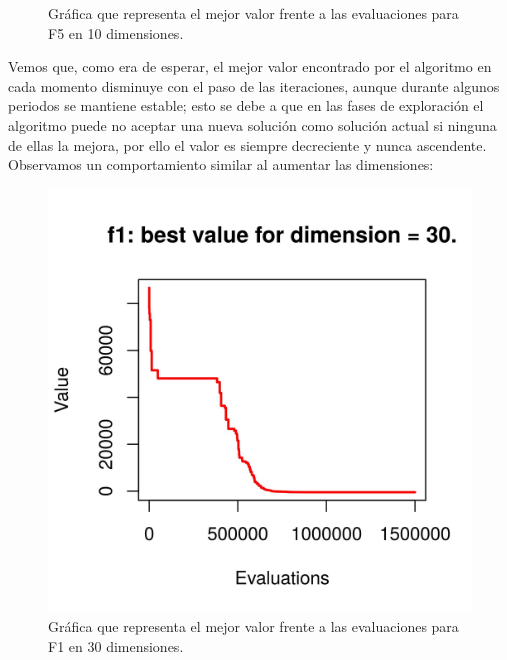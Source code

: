 \documentclass[11pt,a4paper]{article}
\begin{document}
\begin{figure}[!h]
\begin{minipage}[b]{0.4\textwidth}
			\caption{Gráfica que representa el mejor valor frente a las evaluaciones para F5 en 10 dimensiones.}
		\end{minipage}
	\end{figure}
	
	\noindent Vemos que, como era de esperar, el mejor valor encontrado por el algoritmo en cada momento disminuye con el paso de las iteraciones, aunque durante algunos periodos se mantiene estable; esto se debe a que en las fases de exploración el algoritmo puede no aceptar una nueva solución como solución actual si ninguna de ellas la mejora, por ello el valor es siempre decreciente y nunca ascendente. Observamos un comportamiento similar al aumentar las dimensiones:
	
	\begin{figure}[!h]
		\centering
		\begin{minipage}[b]{0.4\textwidth}
			\includegraphics[width=\textwidth]{Imagenes/VS_f1_d30.jpg}
			\caption{Gráfica que representa el mejor valor frente a las evaluaciones para F1 en 30 dimensiones.}
		\end{minipage}
		\hfill
		\begin{minipage}[b]{0.4\textwidth}

\end{minipage}
\end{figure}
\end{document}
